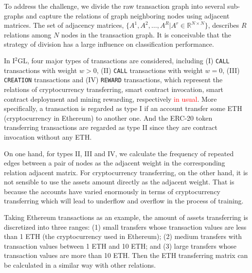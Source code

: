 To address the challenge, we divide the raw transaction graph into several sub-graphs and capture the relations of graph neighboring nodes using adjacent matrices. The set of adjacency matrices, $\{A^1,A^2,\dots,A^R|A^r\in \mathbb{R}^{N \times N}\}$, describes $R$ relations among $N$ nodes in the transaction graph. It is conceivable that the strategy of division has a large influence on classification performance.

In I$^2$GL, four major types of transactions are considered, including (I) \texttt{CALL} transactions with weight $w>0$, (II) \texttt{CALL} transactions with weight $w=0$, (III) \texttt{CREATION} transactions and (IV) \texttt{REWARD} transactions, which represent the relations of cryptocurrency transferring, smart contract invocation, smart contract deployment and mining rewarding, respectively \textcolor{red}{in usual}. More specifically, a transaction is regarded as type I if an account transfer some ETH (cryptocurrency in Ethereum) to another one. And the ERC-20 token transferring transactions are regarded as type II since they are contract invocation without any ETH.

On one hand, for types II, III and IV, we calculate the frequency of repeated edges between a pair of nodes as the adjacent weight in the corresponding relation adjacent matrix. For cryptocurrency transferring, on the other hand, it is not sensible to use the assets amount directly as the adjacent weight. That is because the accounts have varied enormously in terms of cryptocurrency transferring which will lead to underflow and overflow in the process of training.

 Taking Ethereum transactions as an example, the amount of assets transferring is discretized into three ranges: (1) small transfers whose transaction values are less than 1 ETH (the cryptocurrency used in Ethereum); (2) medium transfers with transaction values between 1 ETH and 10 ETH; and (3) large transfers whose transaction values are more than 10 ETH. Then the ETH transferring matrix can be calculated in a similar way with other relations.




